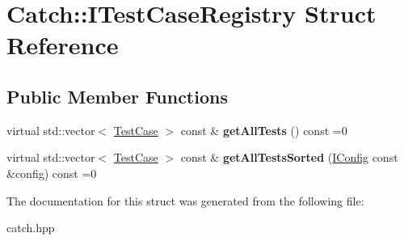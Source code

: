 \hypertarget{structCatch_1_1ITestCaseRegistry}{}\section{Catch\+::I\+Test\+Case\+Registry Struct Reference}
\label{structCatch_1_1ITestCaseRegistry}
\subsection*{Public Member Functions}
\begin{DoxyCompactItemize}
\item 
\mbox{\label{structCatch_1_1ITestCaseRegistry_ad6e4d4a621655123f73ae98cfeda063d}} 
virtual std\+::vector$<$ \mbox{\hyperlink{classCatch_1_1TestCase}{Test\+Case}} $>$ const  \& {\bfseries get\+All\+Tests} () const =0
\item 
\mbox{\label{structCatch_1_1ITestCaseRegistry_a33e46639d0319d35497c05bb5d02be5a}} 
virtual std\+::vector$<$ \mbox{\hyperlink{classCatch_1_1TestCase}{Test\+Case}} $>$ const  \& {\bfseries get\+All\+Tests\+Sorted} (\mbox{\hyperlink{structCatch_1_1IConfig}{I\+Config}} const \&config) const =0
\end{DoxyCompactItemize}


The documentation for this struct was generated from the following file\+:\begin{DoxyCompactItemize}
\item 
catch.\+hpp\end{DoxyCompactItemize}
